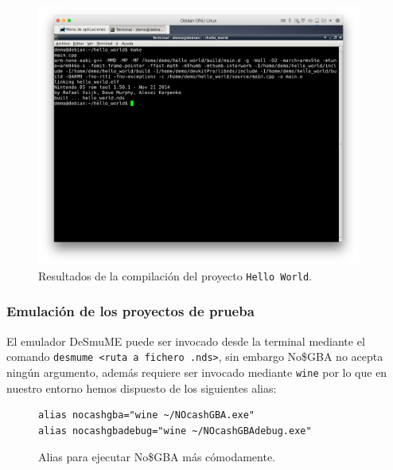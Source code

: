 \begin{figure}[h!]
	\caption{Resultados de la compilación del proyecto {\tt Hello World}.}
	\label{fig:dependency}
	\centering
	\includegraphics[width=0.95\textwidth]{P1Media/Compilado}
\end{figure}
	
	\subsubsection{Emulación de los proyectos de prueba}
	
	El emulador DeSmuME puede ser invocado desde la terminal mediante el comando {\tt desmume <ruta a fichero .nds>}, sin embargo No\$GBA no acepta ningún argumento, además requiere ser invocado mediante {\tt wine} por lo que en nuestro entorno hemos dispuesto de los siguientes alias:
	
\begin{figure}[ht]
\begin{mdframed}[style=exampledefault]
\begin{verbatim}
alias nocashgba="wine ~/NOcashGBA.exe"
alias nocashgbadebug="wine ~/NOcashGBAdebug.exe"
\end{verbatim}
\end{mdframed}

	\caption{Alias para ejecutar No\$GBA más cómodamente.}
	\label{fig:nocashAlias}
\end{figure}
	

